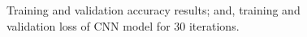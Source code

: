 \begin{figure}%
	\centering
	
	\hspace{8pt}%
	\caption[A set of four subfigures.]{
		 Training and validation accuracy results; and,
		 training and validation loss of CNN model for 30 iterations.}%
	\label{fig:acc_val}%
\end{figure}




